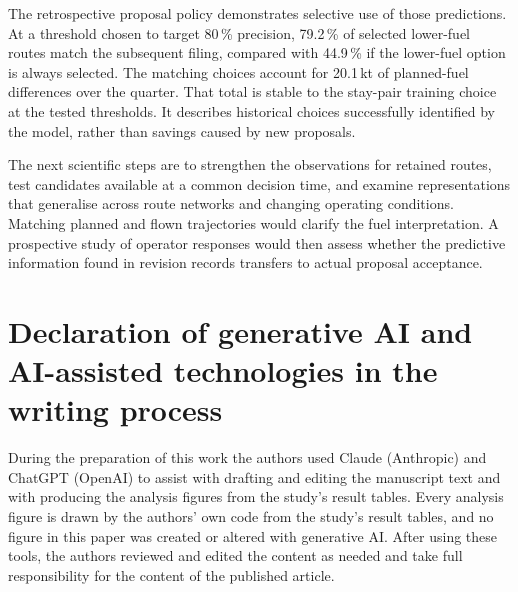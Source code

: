 \documentclass[preprint,authoryear,12pt]{elsarticle}
\begin{document}
The retrospective proposal policy demonstrates selective use of those
predictions. At a threshold chosen to target 80\,\% precision,
79.2\,\% of selected lower-fuel routes match the subsequent filing,
compared with 44.9\,\% if the lower-fuel option is always selected.
The matching choices account for 20.1\,kt of planned-fuel differences
over the quarter. That total is stable to the stay-pair training choice
at the tested thresholds. It describes historical choices successfully
identified by the model, rather than savings caused by new proposals.

The next scientific steps are to strengthen the observations for
retained routes, test candidates available at a common decision time,
and examine representations that generalise across route networks and
changing operating conditions. Matching planned and flown trajectories
would clarify the fuel interpretation. A prospective study of operator
responses would then assess whether the predictive information found
in revision records transfers to actual proposal acceptance.


\section*{Declaration of generative AI and AI-assisted technologies in
the writing process}
During the preparation of this work the authors used Claude
(Anthropic) and ChatGPT (OpenAI) to assist with drafting and editing the manuscript text
and with producing the analysis figures from the study's result
tables. Every analysis figure is drawn by the authors' own code from
the study's result tables, and no figure in this paper was created or
altered with generative AI. After using these tools, the authors
reviewed and edited the content as needed and take full responsibility
for the content of the published article.



\end{document}
